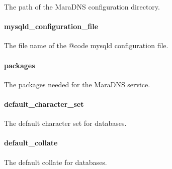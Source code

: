 
The path of the MaraDNS configuration directory.

\paragraph{mysqld\_configuration\_file}


The file name of the {@code mysqld} configuration file.

\paragraph{packages}


The packages needed for the MaraDNS service.

\paragraph{default\_character\_set}


The default character set for databases.

\paragraph{default\_collate}


The default collate for databases.
